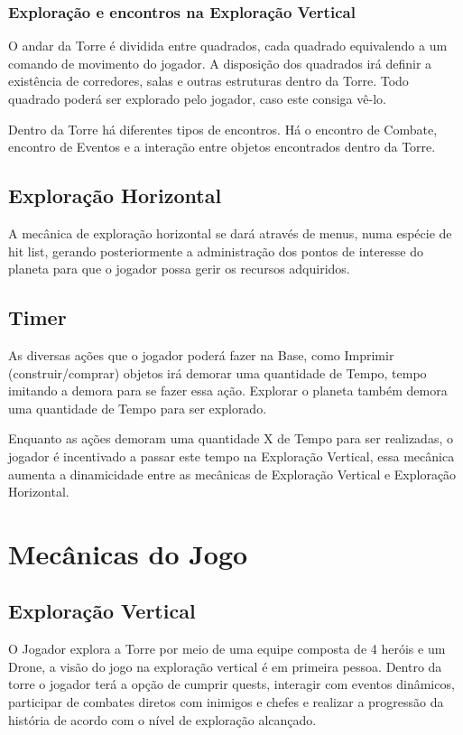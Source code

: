 \documentclass[11pt]{article} %
\begin{document}
\subsubsection{Exploração e encontros na Exploração Vertical}
O andar da Torre é dividida entre quadrados, cada quadrado equivalendo a um comando de movimento do jogador. A disposição dos quadrados irá definir a existência de corredores, salas e outras estruturas dentro da Torre. Todo quadrado poderá ser explorado pelo jogador, caso este consiga vê-lo.

Dentro da Torre há diferentes tipos de encontros. Há o encontro de Combate, encontro de Eventos e a interação entre objetos encontrados dentro da Torre.

\subsection{Exploração Horizontal}
A mecânica de exploração horizontal se dará através de menus, numa espécie de hit list, gerando posteriormente a administração dos pontos de interesse do planeta para que o jogador possa gerir os recursos adquiridos.

\subsection{Timer}
As diversas ações que o jogador poderá fazer na Base, como Imprimir (construir/comprar) objetos irá demorar uma quantidade de Tempo, tempo imitando a demora para se fazer essa ação. Explorar o planeta também demora uma quantidade de Tempo para ser explorado.

Enquanto as ações demoram uma quantidade X de Tempo para ser realizadas, o jogador é incentivado a passar este tempo na Exploração Vertical, essa mecânica aumenta a dinamicidade entre as mecânicas de Exploração Vertical e Exploração Horizontal.

\section{Mecânicas do Jogo}

\subsection{Exploração Vertical}
O Jogador explora a Torre por meio de uma equipe composta de 4 heróis e um Drone, a visão do jogo na exploração vertical é em primeira pessoa. Dentro da torre o jogador terá a opção de cumprir quests, interagir com eventos dinâmicos, participar de combates diretos com inimigos e chefes e realizar a progressão da história de acordo com o nível de exploração alcançado.
\end{document}
